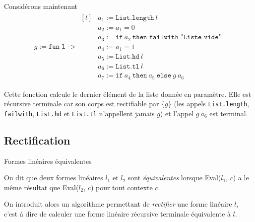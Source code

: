 \begin{example}
    Considérons maintenant
    \begin{align*}
        g := \texttt{fun l -> }
        \begin{aligned}[t]
             & a_1 := \texttt{List.length}\ l                                     \\
             & a_2 := a_1 = 0                                                     \\
             & a_3 := \texttt{if}\ a_2\ \texttt{then failwith "Liste vide"}       \\
             & a_4 := a_1 = 1                                                     \\
             & a_5 := \texttt{List.hd}\ l                                         \\
             & a_6 := \texttt{List.tl}\ l                                         \\
             & a_7 := \texttt{if}\ a_4\ \texttt{then}\ a_5\ \texttt{else}\ g\ a_6
        \end{aligned}
    \end{align*}

    Cette fonction calcule le dernier élément de la liste donnée en paramètre.
    Elle est récursive terminale car son corps est rectifiable par $\{g\}$ (les
    appels \texttt{List.length}, \texttt{failwith}, \texttt{List.hd} et
    \texttt{List.tl} n'appellent jamais $g$) et l'appel $g\ a_6$ est terminal.
\end{example}

\subsection{Rectification}

\begin{definition}
    Formes linéaires équivalentes

    On dit que deux formes linéaires $l_1$ et $l_2$ sont
    \textit{équivalentes} lorsque Eval($l_1$, $c$) a le même résultat que
    Eval($l_2$, $c$) pour tout contexte $c$.
\end{definition}

On introduit alors un algorithme permettant de \textit{rectifier} une forme
linéaire $l$, c'est à dire de calculer une forme linéaire récursive
terminale équivalente à $l$.

